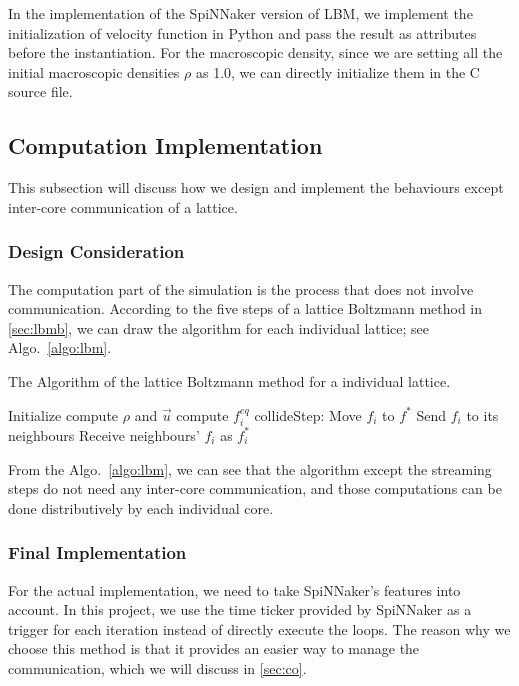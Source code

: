 In the implementation of the SpiNNaker version of LBM, we implement the initialization of velocity function in Python and pass the result as attributes before the instantiation. For the macroscopic density, since we are setting all the initial macroscopic densities $\rho$ as 1.0, we can directly initialize them in the C source file.  \\

\subsection{Computation Implementation} \label{sec:cp}
This subsection will discuss how we design and implement the behaviours except inter-core communication of a lattice.\\
\subsubsection{Design Consideration}
The computation part of the simulation is the process that does not involve communication. According to the five steps of a lattice Boltzmann method in \ref{sec:lbmb}, we can draw the algorithm for each individual lattice; see Algo.~\ref{algo:lbm}.\\

\begin{algorithm}
 \caption{The Algorithm of the lattice Boltzmann method for a individual lattice.}
 \label{algo:lbm}
 Initialize\;
  {
  compute $\rho$ and $\vec u$\;
 compute $f_i^{eq}$\;
 collideStep: Move $f_i$ to $f^*$ \;  
 Send $f_i$ to its neighbours\;  
 Receive neighbours' $f_i$ as $f_i^{*}$\; 
 }
 
\end{algorithm}

From the Algo.~\ref{algo:lbm}, we can see that the algorithm except the streaming steps do not need any inter-core communication, and those computations can be done distributively by each individual core.\\

\subsubsection{Final Implementation}
For the actual implementation, we need to take SpiNNaker's features into account. In this project, we use the time ticker provided by SpiNNaker as a trigger for each iteration instead of directly execute the loops. The reason why we choose this method is that it provides an easier way to manage the communication, which we will discuss in \ref{sec:co}.\\


